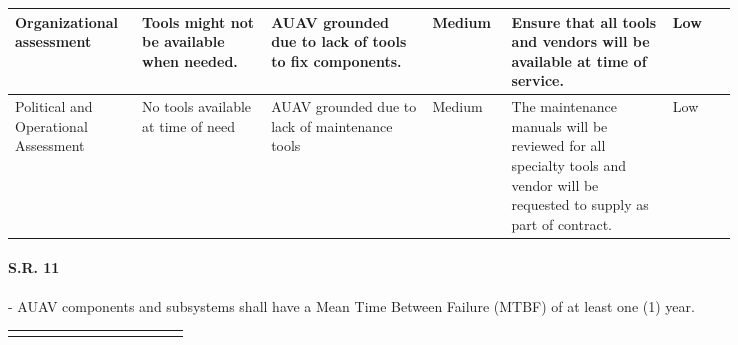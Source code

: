\begin{fullwidth}
\begin{landscape}
{\begin{longtable}{| L{0.12\linewidth} | L{0.16\linewidth} |  L{0.20\linewidth} | L{0.08\linewidth} | L{0.20\linewidth} | L{0.08\linewidth} |}
        \hline
        Organizational assessment & Tools might not be available when needed. & AUAV grounded due to lack of tools to fix components. &  Medium & Ensure that all tools and vendors will be available at time of service. &  Low \\
        \hline
        Political and Operational Assessment & No tools available at time of need & AUAV grounded due to lack of maintenance tools &  Medium & The maintenance manuals will be reviewed for all specialty tools and vendor will be requested to supply as part of contract. &  Low 
        \label{tab:sr10_feasibility}
    \end{longtable}
    }
    
    \newpage
    
    
    \paragraph{S.R. 11} - AUAV components and subsystems shall have a Mean Time Between Failure (MTBF) of at least one (1) year.
    
    {\fontsize{10pt}{11pt}\selectfont
    \begin{longtable}{| L{0.12\linewidth} | L{0.16\linewidth} |  L{0.20\linewidth} | L{0.08\linewidth} | L{0.20\linewidth} | L{0.08\linewidth} |}
        \hline \endlastfoot
        

\end{longtable}}
\end{landscape}
\end{fullwidth}
